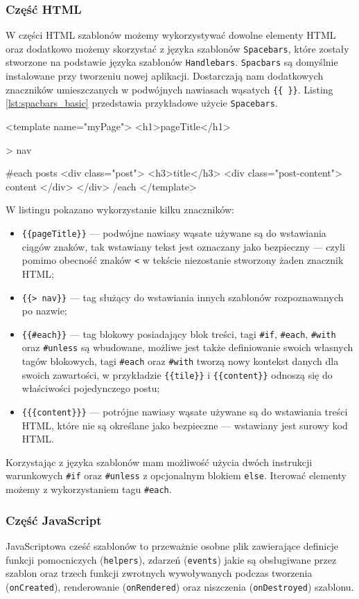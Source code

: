     \subsubsection{Część HTML}
W części HTML szablonów możemy wykorzystywać dowolne elementy HTML oraz dodatkowo możemy skorzystać z języka szablonów \verb|Spacebars|, które zostały stworzone na podstawie języka szablonów \verb|Handlebars|. \verb|Spacbars| są domyślnie instalowane przy tworzeniu nowej aplikacji. Dostarczają nam dodatkowych znaczników umieszczanych w podwójnych nawiasach wąsatych \verb|{{ }}|. Listing \ref{lst:spacbars_basic} przedstawia przykładowe użycie \verb|Spacebars|.
\begin{html}[caption={{\textit{Spacebars}}},label={lst:spacbars_basic}]
<template name="myPage">
  <h1>{{pageTitle}}</h1>

  {{> nav}}

  {{#each posts}}
    <div class="post">
      <h3>{{title}}</h3>
      <div class="post-content">
        {{{content}}}
      </div>
    </div>
  {{/each}}
</template>
\end{html}
W listingu pokazano wykorzystanie kilku znaczników:
\begin{itemize}
 \item \verb|{{pageTitle}}| --- podwójne nawiasy wąsate używane są do wstawiania ciągów znaków, tak wstawiany tekst jest oznaczany jako bezpieczny --- czyli pomimo obecność znaków \verb|<| w tekście niezostanie stworzony żaden znacznik HTML;
 \item \verb|{{> nav}}| --- tag służący do wstawiania innych szablonów rozpoznawanych po nazwie;
 \item \verb|{{#each}}| --- tag blokowy posiadający blok treści, tagi \verb|#if|, \verb|#each|, \verb|#with| oraz \verb|#unless| są wbudowane, możliwe jest także definiowanie swoich własnych tagów blokowych, tagi \verb|#each| oraz \verb|#with| tworzą nowy kontekst danych dla swoich zawartości, w przykładzie \verb|{{tile}}| i \verb|{{content}}| odnoszą się do właściwości pojedynczego postu;
 \item \verb|{{{content}}}| --- potrójne nawiasy wąsate używane są do wstawiania treści HTML, które nie są określane jako bezpieczne --- wstawiany jest surowy kod HTML. 
\end{itemize}
Korzystając z języka szablonów mam możliwość użycia dwóch instrukcji warunkowych \verb|#if| oraz \verb|#unless| z opcjonalnym blokiem \verb|else|. Iterować elementy możemy z wykorzystaniem tagu \verb|#each|. 
    \subsubsection{Część JavaScript}
JavaScriptowa cześć szablonów to przeważnie osobne plik zawierające definicje funkcji pomocniczych (\verb|helpers|), zdarzeń (\verb|events|) jakie są obsługiwane przez szablon oraz trzech funkcji zwrotnych wywoływanych podczas tworzenia (\verb|onCreated|), renderowanie (\verb|onRendered|) oraz niszczenia (\verb|onDestroyed|) szablonu.

